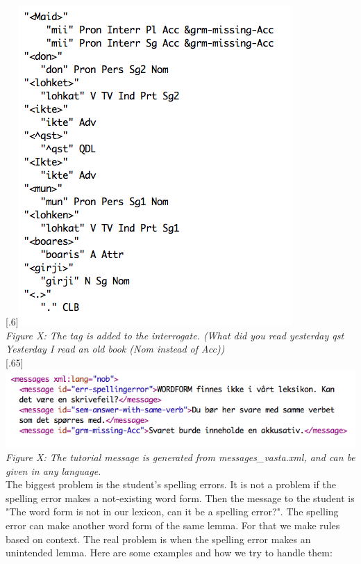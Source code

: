 \documentclass[a4paper,12pt]{article}
\begin{document}
\scalebox{.6}[.6]{\includegraphics{img/maid_lohket_ikte.png}}
\\
\textit{Figure X: The tag is added to the interrogate. (What did you read yesterday qst Yesterday I read an old book (Nom instead of Acc))}\\



\scalebox{.65}[.65]{\includegraphics{img/messages_vasta.png}}
\\
\textit{Figure X: The tutorial message is generated from messages\_vasta.xml, and can be given in any language.}\\


The biggest problem is the student's spelling errors. It is not a problem if the spelling error makes a not-existing word form. Then the message to the student is  "The word form is not in our lexicon, can it be a spelling error?". The spelling error can make another word form of the same lemma. For that we make rules based on context. The real problem is when the spelling error makes an unintended lemma. Here are some examples and how we try to handle them:\\
\end{document}
